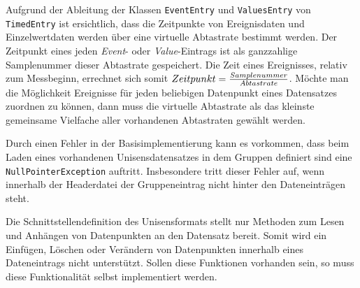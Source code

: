Aufgrund der Ableitung der Klassen \verb|EventEntry| und \verb|ValuesEntry| von \verb|TimedEntry| ist ersichtlich, dass die Zeitpunkte von Ereignisdaten und Einzelwertdaten werden \"uber eine virtuelle Abtastrate bestimmt werden.
Der Zeitpunkt eines jeden \emph{Event}- oder \emph{Value}-Eintrags ist als ganzzahlige Samplenummer dieser Abtastrate gespeichert.
Die Zeit eines Ereignisses, relativ zum Messbeginn, errechnet sich somit $Zeitpunkt = {Samplenummer \over Abtastrate}$.
M\"ochte man die M\"oglichkeit Ereignisse f\"ur jeden beliebigen Datenpunkt eines Datensatzes zuordnen zu k\"onnen, dann muss die virtuelle Abtastrate als das kleinste gemeinsame Vielfache aller vorhandenen Abtastraten gew\"ahlt werden.

Durch einen Fehler in der Basisimplementierung kann es vorkommen, dass beim Laden eines vorhandenen Unisensdatensatzes in dem Gruppen definiert sind eine \verb|NullPointerException| auftritt.
Insbesondere tritt dieser Fehler auf, wenn innerhalb der Headerdatei der Gruppeneintrag nicht hinter den Dateneintr\"agen steht.

Die Schnittstellendefinition des Unisensformats stellt nur Methoden zum Lesen und Anh\"angen von Datenpunkten an den Datensatz bereit.
Somit wird ein Einf\"ugen, L\"oschen oder Ver\"andern von Datenpunkten innerhalb eines Dateneintrags nicht unterst\"utzt.
Sollen diese Funktionen vorhanden sein, so muss diese Funktionalit\"at selbst implementiert werden.

